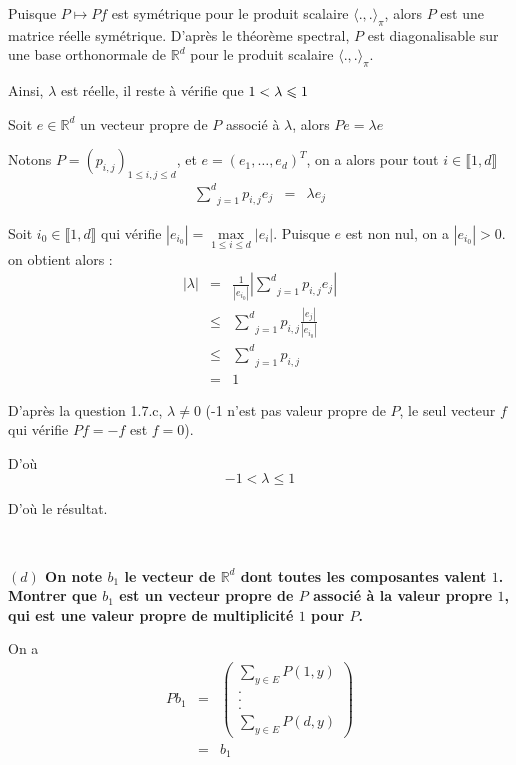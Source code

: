 Puisque $P \longmapsto P f$ est sym{\'e}trique pour le produit scalaire
$\langle ., . \rangle_{\pi}$, alors $P$ est une matrice r{\'e}elle
sym{\'e}trique. D'apr{\`e}s le th{\'e}or{\`e}me spectral, $P$ est
diagonalisable sur une base orthonormale de $\mathbb{R}^d$ pour le produit
scalaire $\langle ., . \rangle_{\pi}$.

Ainsi, $\lambda$ est r{\'e}elle, il reste {\`a} v{\'e}rifie que
$\nonconverted{minus} 1 < \lambda \leqslant 1$

Soit $e \in \mathbb{R}^d$ un vecteur propre de $P$ associ{\'e} {\`a}
$\lambda$, alors $P e = \lambda e$

Notons $P = (p_{i, j})_{1 \leqslant i, j \leqslant d}$, et $e = (e_1, \ldots,
e_d)^T$, on a alors pour tout $i \in \llbracket 1, d \rrbracket$
\begin{eqnarray*}
  \underset{j = 1}{\overset{d}{\sum}} p_{i, j} e_j & = & \lambda e_j
\end{eqnarray*}

Soit $i_0 \in \llbracket 1, d \rrbracket$ qui v{\'e}rifie $| e_{i_0} | =
\underset{1 \leqslant i \leqslant d}{\max} | e_i |$. Puisque $e$ est non nul,
on a $| e_{i_0} | > 0$. on obtient alors :
\begin{eqnarray*}
  | \lambda | & = & \frac{1}{| e_{i_0} |} \left| \underset{j =
  1}{\overset{d}{\sum}} p_{i, j} e_j \right|\\
  & \leqslant & \underset{j = 1}{\overset{d}{\sum}} p_{i, j} \frac{| e_j |}{|
  e_{i_0} |}\\
  & \leqslant & \underset{j = 1}{\overset{d}{\sum}} p_{i, j}\\
  & = & 1
\end{eqnarray*}


D'apr{\`e}s la question 1.7.c, $\lambda \neq 0$ (-1 n'est pas valeur propre de
$P$, le seul vecteur $f$ qui v{\'e}rifie $P f = - f$ est $f = 0$).

D'o{\`u}
\[ - 1 < \lambda \leqslant 1 \]


D'o{\`u} le r{\'e}sultat.

\

\textbf{$(d)$ On note $b_1$ le vecteur de $\mathbb{R}^d$ dont toutes
les composantes valent $1$. Montrer que $b_1$ est un vecteur propre de $P$
associ{\'e} {\`a} la valeur propre $1$, qui est une valeur propre de
multiplicit{\'e} $1$ pour $P$.}

On a
\begin{eqnarray*}
  P b_1 & = & \left( \begin{array}{c}
    \sum_{y \in E} P (1, y)\\
    .\\
    .\\
    .\\
    \sum_{y \in E} P (d, y)
  \end{array} \right)\\
  & = & b_1
\end{eqnarray*}



